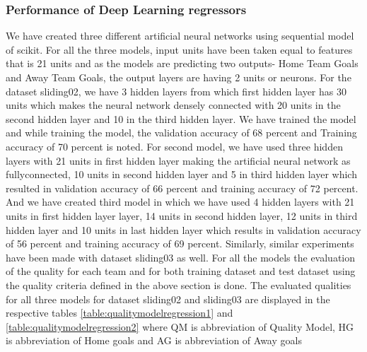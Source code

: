 \subsubsection{Performance of Deep Learning regressors}
We have created three different artificial neural networks using sequential model of scikit. For all the three models, input units have been taken equal to features that is 21 units and as the models are predicting two outputs- Home Team Goals and Away Team Goals, the output layers are having 2 units or neurons. For the dataset sliding02, we have 3 hidden layers from which first hidden layer has 30 units which makes the neural network densely connected with 20 units in the second hidden layer and 10 in the third hidden layer. We have trained the model and while training the model, the validation accuracy of 68 percent and Training accuracy of 70 percent is noted. For second model, we have used three hidden layers with 21 units in first hidden layer making the artificial neural network as fullyconnected, 10 units in second hidden layer and 5 in third hidden layer which resulted in validation accuracy of 66 percent and training accuracy of 72 percent. 
And we have created third model in which we have used 4 hidden layers with 21 units in first hidden layer layer, 14 units in second hidden layer, 12 units in third hidden layer and 10 units in last hidden layer which results in validation accuracy of 56 percent and training accuracy of 69 percent.\newline
Similarly, similar experiments have been made with dataset sliding03 as well. For all the models the evaluation of the quality for each team and for both training dataset and test dataset using the quality criteria defined in the above section is done. The evaluated qualities for all three models for dataset sliding02 and sliding03 are displayed in the respective tables \autoref{table:qualitymodelregression1} and \autoref{table:qualitymodelregression2} where QM is abbreviation of Quality Model, HG is abbreviation of Home goals and AG is abbreviation of Away goals\newline

\begin{table}
\centering
{}
\caption{ Quality Model for models with different hidden units for dataset sliding02}
\label{table:qualitymodelregression1}
\end{table}



